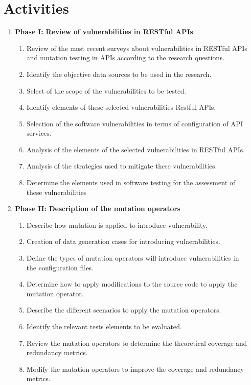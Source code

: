 \section{Activities} \label{sec:activities}

\begin{enumerate}
  \item{\textbf{Phase I: Review of vulnerabilities in RESTful APIs}

    \begin{enumerate}
      \item Review of the most recent surveys about vulnerabilities in RESTful APIs and mutation testing in APIs according to the research questions.
      \item Identify the objective data sources to be used in the research.
      \item Select of the scope of the vulnerabilities to be tested.
      \item Identify elements of these selected vulnerabilities Restful APIs.
      \item Selection of the software vulnerabilities in terms of configuration of API services.
      \item Analysis of the elements of the selected vulnerabilities in RESTful APIs.
      \item Analysis of the strategies used to mitigate these vulnerabilities.
      \item Determine the elements used in software testing for the assessment of these vulnerabilities
  \end{enumerate}}

  \item{\textbf{Phase II: Description of the mutation operators}

    \begin{enumerate}
      \item Describe how mutation is applied to introduce vulnerability.
      \item Creation of data generation cases for introducing vulnerabilities. 
      \item Define the types of mutation operators will introduce vulnerabilities in the configuration files.
      \item Determine how to apply modifications to the source code to apply the mutation operator.
      \item Describe the different scenarios to apply the mutation operators.
      \item Identify the relevant tests elements to be evaluated.
      \item Review the mutation operators to determine the theoretical coverage and redundancy metrics.
      \item Modify the mutation operators to improve the coverage and redundancy metrics.
  \end{enumerate}}


\end{enumerate}
